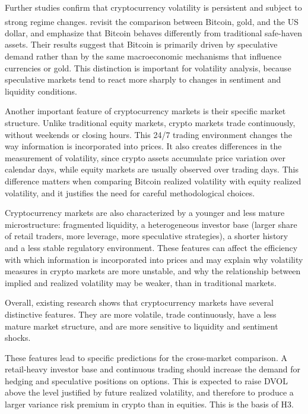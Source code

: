 \documentclass[11pt,a4paper,openany]{report}
\newcommand{\fcitet}[1]{%
  \citet{#1}%
  \refstepcounter{footnote}%
  \hyperlink{cite.#1}{\textsuperscript{\thefootnote}}%
  \footnotetext{\bibentry{#1}.}%
}
\begin{document}
Further studies confirm that cryptocurrency volatility is persistent and
subject to strong regime changes. \fcitet{baur2018} revisit the comparison between
Bitcoin, gold, and the US dollar, and emphasize that Bitcoin behaves
differently from traditional safe-haven assets. Their results suggest
that Bitcoin is primarily driven by speculative demand rather than by
the same macroeconomic mechanisms that influence currencies or gold.
This distinction is important for volatility analysis, because
speculative markets tend to react more sharply to changes in sentiment
and liquidity conditions.

Another important feature of cryptocurrency markets is their specific
market structure. Unlike traditional equity markets, crypto markets
trade continuously, without weekends or closing hours. This 24/7 trading
environment changes the way information is incorporated into prices. It
also creates differences in the measurement of volatility, since crypto
assets accumulate price variation over calendar days, while equity
markets are usually observed over trading days. This difference matters
when comparing Bitcoin realized volatility with equity realized
volatility, and it justifies the need for careful methodological
choices.

Cryptocurrency markets are also characterized by a younger and less
mature microstructure: fragmented liquidity, a heterogeneous investor
base (larger share of retail traders, more leverage, more speculative
strategies), a shorter history and a less stable regulatory
environment. These features can affect the efficiency with which
information is incorporated into prices and may explain why volatility
measures in crypto markets are more unstable, and why the relationship
between implied and realized volatility may be weaker, than in
traditional markets.

Overall, existing research shows that cryptocurrency markets have
several distinctive features. They are more volatile, trade
continuously, have a less mature market structure, and are more
sensitive to liquidity and sentiment shocks.

These features lead to specific predictions for the cross-market
comparison. A retail-heavy investor base and continuous trading should
increase the demand for hedging and speculative positions on options.
This is expected to raise DVOL above the level justified by future
realized volatility, and therefore to produce a larger variance risk
premium in crypto than in equities. This is the basis of H3.
\end{document}
